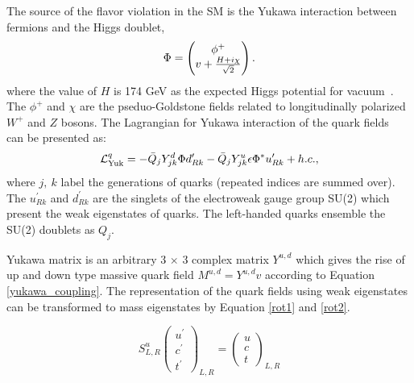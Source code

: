  
The source of the flavor violation in the SM is the Yukawa interaction between fermions and the Higgs doublet,
\begin{equation}{\label{Eqn:higgs_field}}
\Phi = 
\begin{pmatrix}
\phi^+\\
v + \frac{H+i\chi}{\sqrt{2}}
\end{pmatrix}.
\end{equation}
where the value of $H$ is 174 GeV as the expected Higgs potential for vacuum~\cite{b2book}. The $\phi^+$ and $\chi$ are the pseduo-Goldstone fields related to longitudinally polarized $W^+$ and $Z$ bosons. The Lagrangian for Yukawa interaction of the quark fields~\cite{ceccucci2008ckm} can be presented as:
\begin{equation}{\label{yukawa_coupling}}
\mathcal{L}_{\text{Yuk}}^q = 
-\bar{Q}_j Y^d_{jk} \Phi d_{Rk}^\prime 
-\bar{Q}_j Y^u_{jk} \epsilon \Phi^* u_{Rk}^\prime
+ h.c.,
\end{equation}
where $j,~k$ label the generations of quarks (repeated indices are summed over). The $u_{Rk}^\prime$ and $d_{Rk}^\prime$ are the singlets of the electroweak gauge group SU(2) which present the weak eigenstates of quarks. The left-handed quarks ensemble the SU(2) doublets as ${Q}_j$.
\begin{comment}
\begin{equation}\label{eq:eps}
\epsilon =  
\begin{pmatrix}
0 & 1\\
-1 & 0
\end{pmatrix}
\end{equation}
\end{comment}

Yukawa matrix is an arbitrary 3 $\times$ 3 complex matrix $Y^{u,d}$ which gives the rise of up and down type massive quark field $M^{u,d}=Y^{u,d}v$ according to Equation \ref{yukawa_coupling}. The representation of the quark fields using weak eigenstates can be transformed to mass eigenstates by Equation \ref{rot1} and \ref{rot2}.

\begin{equation}\label{rot1}
S_{L,R}^{u}
\begin{pmatrix}
u^\prime   \\
c^\prime  \\
t^\prime 
\end{pmatrix}_{L,R}
= \begin{pmatrix}
u  \\
c  \\
t 
\end{pmatrix}_{L,R}
\end{equation}

